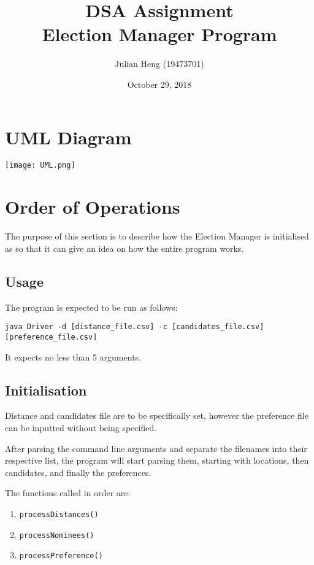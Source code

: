 \documentclass[a4paper, 12pt, titlepage]{article}
\title{\huge \textbf{DSA Assignment\\Election Manager Program}}
\author{Julian Heng (19473701)}
\date{October 29, 2018}
\newcommand{\code}[1]{\small\texttt{#1}\normalsize}
\begin{document}
\maketitle
\tableofcontents
\newpage

\pagestyle{fancy}

\fancyhf[FC]{\thepage}

\section{UML Diagram}

\texttt{[image: UML.png]}

\newpage

\section{Order of Operations}

The purpose of this section is to describe how the Election Manager is
initialised as so that it can give an idea on how the entire program works.

\subsection{Usage}
The program is expected to be run as follows:

\code{java Driver -d [distance\_file.csv]
-c [candidates\_file.csv] [preference\_file.csv]}

It expects no less than 5 arguments.

\subsection{Initialisation}
Distance and candidates file are to be specifically set, however the
preference file can be inputted without being specified.

After parsing the command line arguments and separate the filenames
into their respective list, the program will start parsing them, starting
with locations, then candidates, and finally the preferences.

The functions called in order are:
\begin{enumerate}
    \item \code{processDistances()}
    \item \code{processNominees()}
    \item \code{processPreference()}
\end{enumerate}
\end{document}
